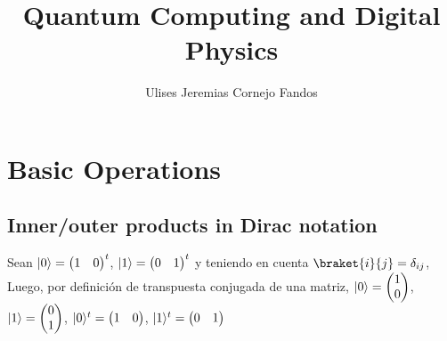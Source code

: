 \documentclass[osajnl,preprint,showpacs,superscriptaddress,10pt]{revtex4-1} %
\DeclarePairedDelimiter\ket{\lvert}{\rangle}
\begin{document}
\title{Quantum Computing and Digital Physics}

\author{Ulises Jeremias Cornejo Fandos}

\begin{abstract}

\end{abstract}

\maketitle %

\section{Basic Operations}

\subsection{Inner/outer products in Dirac notation}

Sean $\ket{0} = \begin{pmatrix}1 & 0\end{pmatrix}^t$, $\ket{1} = \begin{pmatrix}0 & 1\end{pmatrix}^t$ y teniendo en cuenta $\braket{i}{j} = \delta_{ij}$, \\

Luego, por definición de transpuesta conjugada de una matriz, $\ket{0} = \begin{pmatrix}1 \\ 0\end{pmatrix}$, $\ket{1} = \begin{pmatrix}0 \\ 1\end{pmatrix}$, $\ket{0}^t = \begin{pmatrix}1 & 0\end{pmatrix}$, $\ket{1}^t = \begin{pmatrix}0 & 1\end{pmatrix}$ \\
\end{document}
